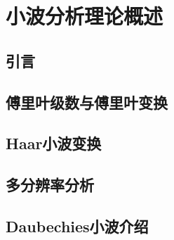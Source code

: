 \chapter{小波分析理论概述}\label{chap:introduction}

\section{引言}

\section{傅里叶级数与傅里叶变换}

\section{Haar小波变换}

\section{多分辨率分析}

\section{Daubechies小波介绍}